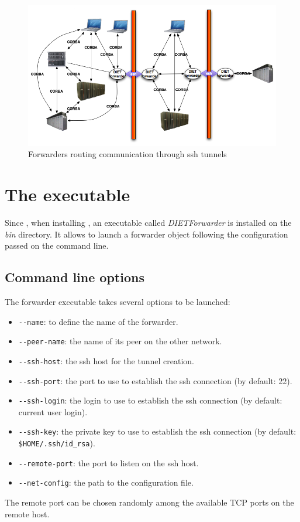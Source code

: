 \begin{figure}[htp]
\begin{center}
  \includegraphics[width=12cm]{fig/Forwarder}
\end{center}
\caption{Forwarders routing \diet communication through ssh tunnels
  \label{fig:forwarder}}
\end{figure}

\section{The \dietforwarder executable}
\label{sec:ForwarderConfig}
Since , when installing \diet, an executable called \textit{DIETForwarder}
is installed on the \textit{bin} directory. It allows to launch a
forwarder object following the configuration passed on the command
line.
\subsection{Command line options}
The \diet forwarder executable takes several options to be launched:
\begin{itemize}
\item \verb#--name#: to define the name of the forwarder.
\item \verb#--peer-name#: the name of its peer on the other network.
\item \verb#--ssh-host#: the ssh host for the tunnel creation.
\item \verb#--ssh-port#: the port to use to establish the ssh
  connection (by default: 22).
\item \verb#--ssh-login#: the login to use to establish the ssh
  connection (by default: current user login).
\item \verb#--ssh-key#: the private key to use to establish the ssh
  connection (by default: \verb#$HOME/.ssh/id_rsa#).
\item \verb#--remote-port#: the port to listen on the ssh host.
\item \verb#--net-config#: the path to the configuration file.
\end{itemize}
The remote port can be chosen randomly among the available TCP ports
on the remote host.\\

